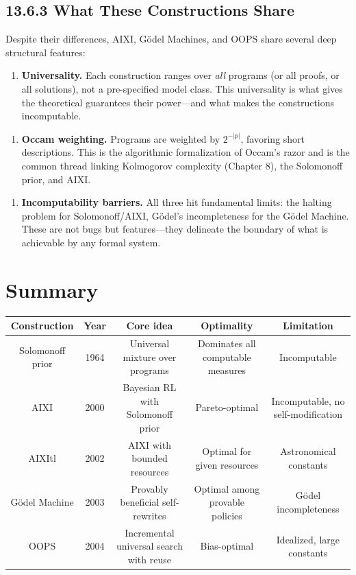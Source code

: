 \subsection{13.6.3 What These Constructions Share}

Despite their differences, AIXI, Gödel Machines, and OOPS share several deep structural features:

\begin{enumerate}
\item \textbf{Universality.} Each construction ranges over \textit{all} programs (or all proofs, or all solutions), not a pre-specified model class. This universality is what gives the theoretical guarantees their power---and what makes the constructions incomputable.
\end{enumerate}

\begin{enumerate}
\item \textbf{Occam weighting.} Programs are weighted by $2^{-|p|}$, favoring short descriptions. This is the algorithmic formalization of Occam's razor and is the common thread linking Kolmogorov complexity (Chapter 8), the Solomonoff prior, and AIXI.
\end{enumerate}

\begin{enumerate}
\item \textbf{Incomputability barriers.} All three hit fundamental limits: the halting problem for Solomonoff/AIXI, Gödel's incompleteness for the Gödel Machine. These are not bugs but features---they delineate the boundary of what is achievable by any formal system.
\end{enumerate}



\section{Summary}

\begin{center}
\begin{tabular}{ccccc}
\toprule
Construction & Year & Core idea & Optimality & Limitation \\
\midrule
Solomonoff prior & 1964 & Universal mixture over programs & Dominates all computable measures & Incomputable \\
AIXI & 2000 & Bayesian RL with Solomonoff prior & Pareto-optimal & Incomputable, no self-modification \\
AIXItl & 2002 & AIXI with bounded resources & Optimal for given resources & Astronomical constants \\
Gödel Machine & 2003 & Provably beneficial self-rewrites & Optimal among provable policies & Gödel incompleteness \\
OOPS & 2004 & Incremental universal search with reuse & Bias-optimal & Idealized, large constants \\
\bottomrule
\end{tabular}
\end{center}

